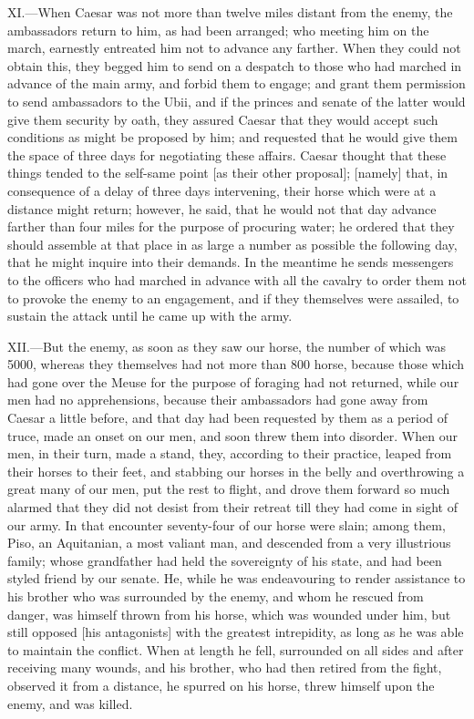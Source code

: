 XI.—When Caesar was not more than twelve miles distant from the enemy,
the ambassadors return to him, as had been arranged; who meeting him on
the march, earnestly entreated him not to advance any farther. When they
could not obtain this, they begged him to send on a despatch to those
who had marched in advance of the main army, and forbid them to engage;
and grant them permission to send ambassadors to the Ubii, and if the
princes and senate of the latter would give them security by oath, they
assured Caesar that they would accept such conditions as might be
proposed by him; and requested that he would give them the space of
three days for negotiating these affairs. Caesar thought that these
things tended to the self-same point [as their other proposal]; [namely]
that, in consequence of a delay of three days intervening, their horse
which were at a distance might return; however, he said, that he would
not that day advance farther than four miles for the purpose of
procuring water; he ordered that they should assemble at that place in
as large a number as possible the following day, that he might inquire
into their demands. In the meantime he sends messengers to the officers
who had marched in advance with all the cavalry to order them not to
provoke the enemy to an engagement, and if they themselves were
assailed, to sustain the attack until he came up with the army.

XII.—But the enemy, as soon as they saw our horse, the number of which
was 5000, whereas they themselves had not more than 800 horse, because
those which had gone over the Meuse for the purpose of foraging had not
returned, while our men had no apprehensions, because their ambassadors
had gone away from Caesar a little before, and that day had been
requested by them as a period of truce, made an onset on our men, and
soon threw them into disorder. When our men, in their turn, made a
stand, they, according to their practice, leaped from their horses to
their feet, and stabbing our horses in the belly and overthrowing a
great many of our men, put the rest to flight, and drove them forward so
much alarmed that they did not desist from their retreat till they had
come in sight of our army. In that encounter seventy-four of our horse
were slain; among them, Piso, an Aquitanian, a most valiant man, and
descended from a very illustrious family; whose grandfather had held the
sovereignty of his state, and had been styled friend by our senate. He,
while he was endeavouring to render assistance to his brother who was
surrounded by the enemy, and whom he rescued from danger, was himself
thrown from his horse, which was wounded under him, but still opposed
[his antagonists] with the greatest intrepidity, as long as he was able
to maintain the conflict. When at length he fell, surrounded on all
sides and after receiving many wounds, and his brother, who had then
retired from the fight, observed it from a distance, he spurred on his
horse, threw himself upon the enemy, and was killed.

